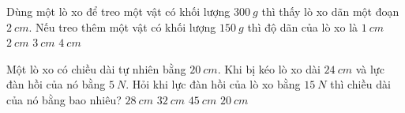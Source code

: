 \begin{ex}
Dùng một lò xo để treo một vật có khối lượng $\SI{300}{g}$ thì thấy lò xo dãn một đoạn $\SI{2}{cm}$. Nếu treo thêm một vật có khối lượng $\SI{150}{g}$ thì độ dãn của lò xo là	
	\choice
	{$\SI{1}{cm}$}
	{$\SI{2}{cm}$}
	{\True $\SI{3}{cm}$}
	{$\SI{4}{cm}$}
\end{ex}
\begin{ex}
	Một lò xo có chiều dài tự nhiên bằng $\SI{20}{cm}$. Khi bị kéo lò xo dài $\SI{24}{cm}$ và lực đàn hồi của nó bằng $\SI{5}{N}$. Hỏi khi lực đàn hồi của lò xo bằng $\SI{15}{N}$ thì chiều dài của nó bằng bao nhiêu?
	\choice
	{$\SI{28}{cm}$}
	{\True $\SI{32}{cm}$}
	{$\SI{45}{cm}$}
	{$\SI{20}{cm}$}
\end{ex}

